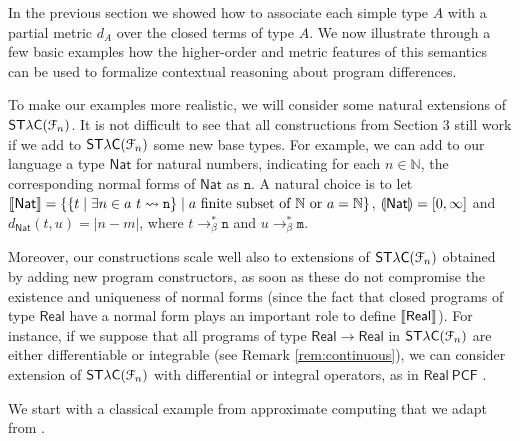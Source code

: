

In the previous section we showed how to associate each simple type $A$ with a  partial metric $d_{A}$ over the closed terms of type $A$. 
We  now illustrate through a few basic examples how the higher-order and metric features of this semantics can be used to formalize contextual reasoning about program differences.


To make our examples more realistic, we will consider some natural extensions of $\mathsf{ST\lambda C}(\mathcal F_{n})$.
It is not difficult to see that all constructions from Section 3 still work if we add to $\mathsf{ST\lambda C}(\mathcal F_{n})$ some new base types. For example, we can add to our language a type $\mathsf{Nat}$ for natural numbers, indicating for each $n\in \mathbb N$, the corresponding normal forms of $\mathsf{Nat}$ as $\mathtt n$. A natural choice is to let   
$\llbracket \mathsf{Nat} \rrbracket=\{ \{ t \mid \exists n\in a \ t\leadsto \mathtt n\}\mid a \text{ finite subset of }\mathbb N \text{ or }a=\mathbb N\}$, $\llparenthesis \mathsf{Nat} \rrparenthesis=[0,\infty]$ and $d_{\mathsf{Nat}}(t,u)=| n-m|$, where $t\to^{*}_{\beta}\mathtt n$ and $u\to^{*}_{\beta}\mathtt m$. 

Moreover, our constructions scale well also to extensions of $\mathsf{ST\lambda C}(\mathcal F_{n})$ obtained by adding new program constructors, as soon as these do not compromise the existence and uniqueness of normal forms (since the fact that closed programs of type $\mathsf{Real}$ have a normal form plays an important role to define $\llbracket \mathsf{Real} \rrbracket$).  
For instance, if we suppose that all programs of type $\mathsf{Real}\to\mathsf{Real}$ in $\mathsf{ST\lambda C}(\mathcal F_{n})$ are either 
differentiable or integrable (see Remark \ref{rem:continuous}), we can consider extension of $\mathsf{ST\lambda C}(\mathcal F_{n})$ with  differential or integral operators, as in $\mathsf{Real\ PCF}$ \cite{Di-Gianantonio:2013aa, Edalat:2000aa}.



We start with a classical example from approximate computing that we adapt from \cite{chaudhuri}. 

